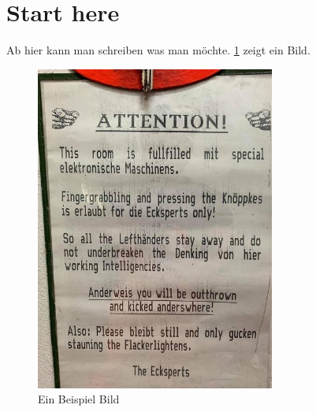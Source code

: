 \section{Start here}
\label{sec:lab1}

Ab hier kann man schreiben was man möchte. \cref{img:test} zeigt ein Bild.

\begin{figure}[h]
	\centering
	\includegraphics[width =0.7\textwidth]{images/test.jpg}
	\caption{Ein Beispiel Bild}
	\label{img:test}
\end{figure}